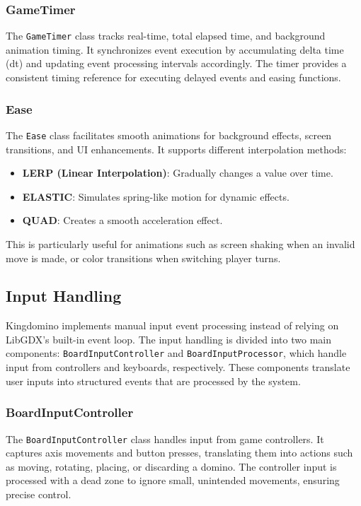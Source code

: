 \documentclass[conference]{IEEEtran}
\begin{document}
\subsubsection{GameTimer}
The \texttt{GameTimer} class tracks real-time, total elapsed time, and
background animation timing. It synchronizes event execution by accumulating
delta time (dt) and updating event processing intervals accordingly. The timer
provides a consistent timing reference for executing delayed events and easing
functions.

\subsubsection{Ease}
The \texttt{Ease} class facilitates smooth animations for background effects,
screen transitions, and UI enhancements. It supports different interpolation
methods:
\begin{itemize}
    \item \textbf{LERP (Linear Interpolation)}: Gradually changes a value over time.
    \item \textbf{ELASTIC}: Simulates spring-like motion for dynamic effects.
    \item \textbf{QUAD}: Creates a smooth acceleration effect.
\end{itemize}
This is particularly useful for animations such as screen shaking when an invalid move is made, or color transitions when switching player turns.

\subsection{Input Handling}
Kingdomino implements manual input event processing instead of relying on LibGDX's built-in event loop. The input handling is divided into two main components: \texttt{BoardInputController} and \texttt{BoardInputProcessor}, which handle input from controllers and keyboards, respectively. These components translate user inputs into structured events that are processed by the system.

\subsubsection{BoardInputController}
The \texttt{BoardInputController} class handles input from game controllers. It captures axis movements and button presses, translating them into actions such as moving, rotating, placing, or discarding a domino. The controller input is processed with a dead zone to ignore small, unintended movements, ensuring precise control.
\end{document}
